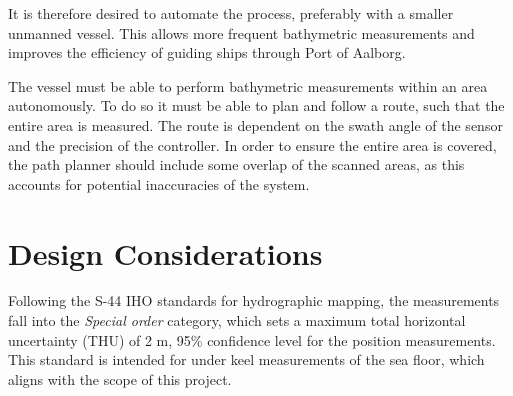 It is therefore desired to automate the process, preferably with a smaller unmanned vessel. This allows more frequent bathymetric measurements and improves the efficiency of guiding ships through Port of Aalborg.

The vessel must be able to perform bathymetric measurements within an area autonomously. 
To do so it must be able to plan and follow a route, such that the entire area is measured. 
The route is dependent on the swath angle of the sensor and the precision of the controller. In order to ensure the entire area is covered, the path planner should include some overlap of the scanned areas, as this accounts for potential inaccuracies of the system.








\section{Design Considerations}\label{sec:designconsiderations}
Following the S-44 IHO standards for hydrographic mapping, the measurements fall into the \emph{Special order} category, which sets a maximum total horizontal uncertainty (THU) of 2 m, 95\% confidence level for the position measurements. 
This standard is intended for under keel measurements of the sea floor, which aligns with the scope of this project. \cite{IHO-S-44}

